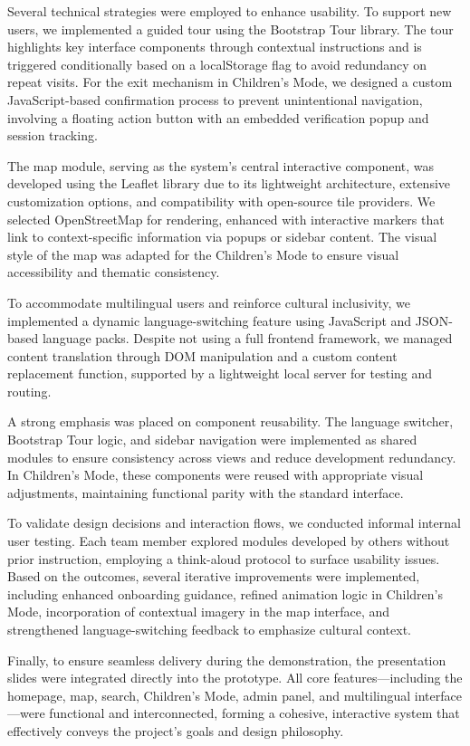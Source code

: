 Several technical strategies were employed to enhance usability. To support new users, we implemented a guided tour using the Bootstrap Tour library. The tour highlights key interface components through contextual instructions and is triggered conditionally based on a localStorage flag to avoid redundancy on repeat visits. For the exit mechanism in Children’s Mode, we designed a custom JavaScript-based confirmation process to prevent unintentional navigation, involving a floating action button with an embedded verification popup and session tracking.

The map module, serving as the system’s central interactive component, was developed using the Leaflet library due to its lightweight architecture, extensive customization options, and compatibility with open-source tile providers. We selected OpenStreetMap for rendering, enhanced with interactive markers that link to context-specific information via popups or sidebar content. The visual style of the map was adapted for the Children’s Mode to ensure visual accessibility and thematic consistency.

To accommodate multilingual users and reinforce cultural inclusivity, we implemented a dynamic language-switching feature using JavaScript and JSON-based language packs. Despite not using a full frontend framework, we managed content translation through DOM manipulation and a custom content replacement function, supported by a lightweight local server for testing and routing.

A strong emphasis was placed on component reusability. The language switcher, Bootstrap Tour logic, and sidebar navigation were implemented as shared modules to ensure consistency across views and reduce development redundancy. In Children’s Mode, these components were reused with appropriate visual adjustments, maintaining functional parity with the standard interface.

To validate design decisions and interaction flows, we conducted informal internal user testing. Each team member explored modules developed by others without prior instruction, employing a think-aloud protocol to surface usability issues. Based on the outcomes, several iterative improvements were implemented, including enhanced onboarding guidance, refined animation logic in Children’s Mode, incorporation of contextual imagery in the map interface, and strengthened language-switching feedback to emphasize cultural context.

Finally, to ensure seamless delivery during the demonstration, the presentation slides were integrated directly into the prototype. All core features—including the homepage, map, search, Children’s Mode, admin panel, and multilingual interface—were functional and interconnected, forming a cohesive, interactive system that effectively conveys the project's goals and design philosophy.

